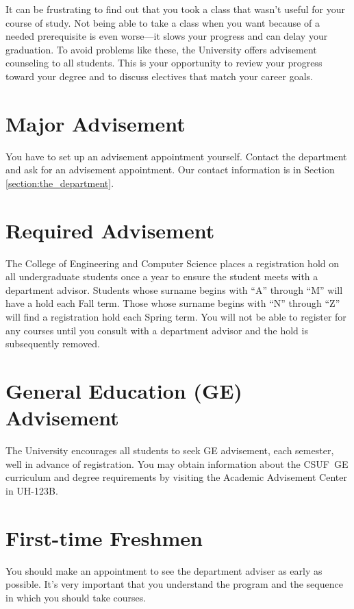 \documentclass{book}
\newcommand{\CampusName}{CSUF}
\begin{document}
It can be frustrating to find out that you took a class that wasn't useful for your course of study. Not being able to take a class when you want because of a needed prerequisite is even worse---it slows your progress and can delay your graduation. To avoid problems like these, the University offers advisement counseling to all students. This is your opportunity to review your progress toward your degree and to discuss electives that match your career goals.

\section{Major Advisement}
You have to set up an advisement appointment yourself. Contact the department and ask for an advisement appointment. Our contact information is in Section \ref{section:the_department}.

\section{Required Advisement}
The College of Engineering and Computer Science places a registration hold on
all undergraduate students once a year to ensure the student meets with a
department advisor. Students whose surname begins with ``A'' through ``M'' will
have a hold each Fall term. Those whose surname begins with ``N'' through
``Z'' will find a registration hold each Spring term.  You will not be able to
register for any courses until you consult with a department advisor and the
hold is subsequently removed.

\section{General Education (GE) Advisement}
 
The University encourages all students to seek GE advisement, each semester, well in advance of registration.  You may obtain information about the \CampusName~GE curriculum and degree requirements by visiting the Academic Advisement Center in UH-123B.

\section{First-time Freshmen}
You should make an appointment to see the department adviser as early as possible. It's very important that you understand the program and the sequence in which you should take courses.
\end{document}
